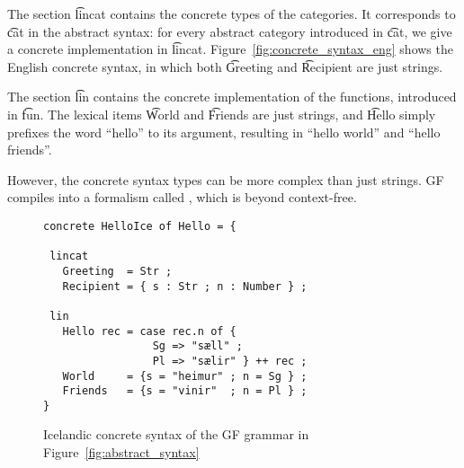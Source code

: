 The section \t{lincat} contains the concrete types of the categories. 
It corresponds to \t{cat} in the abstract syntax: for every abstract category
introduced in \t{cat}, we give a concrete implementation in \t{lincat}.
Figure~\ref{fig:concrete_syntax_eng} shows the English concrete
syntax, in which both \t{Greeting} and \t{Recipient} are just strings.

The section \t{lin} contains the concrete implementation of the
functions, introduced in \t{fun}. The lexical items \t{World} and
\t{Friends} are just strings, and \t{Hello} simply prefixes the word
``hello'' to its argument, resulting in ``hello world'' and ``hello friends''.

However, the concrete syntax types can be more complex than just
strings. GF compiles into a formalism called \pmcfg{}
\cite{seki91pmcfg}, which is beyond context-free.

\begin{figure}[h]
  \centering
\begin{verbatim}
concrete HelloIce of Hello = {

 lincat 
   Greeting  = Str ;
   Recipient = { s : Str ; n : Number } ;

 lin
   Hello rec = case rec.n of {
                 Sg => "sæll" ;
                 Pl => "sælir" } ++ rec ;
   World     = {s = "heimur" ; n = Sg } ;
   Friends   = {s = "vinir"  ; n = Pl } ;
}
\end{verbatim}
\caption{Icelandic concrete syntax of the GF grammar in Figure~\ref{fig:abstract_syntax}}
\label{fig:concrete_syntax_ice}
\end{figure}